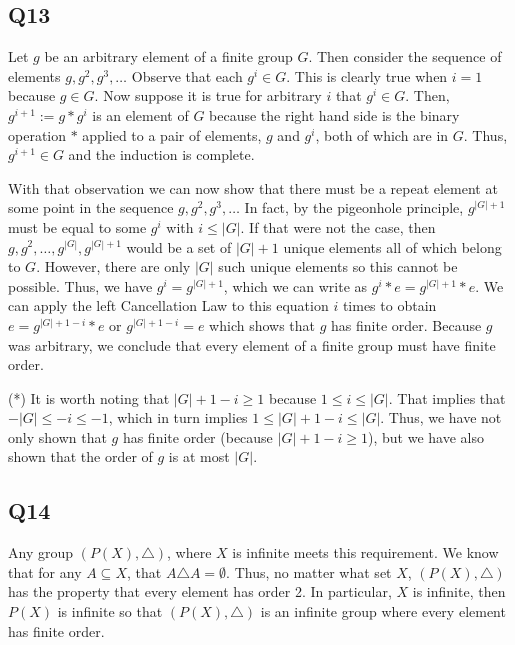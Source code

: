 \documentclass[12pt]{article}
\numberwithin{theorem}{section}
\numberwithin{equation}{section}
\numberwithin{remark}{section}
\numberwithin{definition}{section}
\numberwithin{theorem}{section}
\numberwithin{lemma}{section}
\numberwithin{example}{section}
\begin{document}
\subsection{Q13}

Let $g$ be an arbitrary element of a finite group $G$. Then consider the sequence of elements $g,g^2,g^3,\ldots$ Observe that each $g^i\in G$. This is clearly true when $i=1$ because $g\in G$. Now suppose it is true for arbitrary $i$ that $g^i \in G$. Then, $g^{i+1}:=g*g^i$ is an element of $G$ because the right hand side is the binary operation $*$ applied to a pair of elements, $g$ and $g^i$, both of which are in $G$. Thus, $g^{i+1}\in G$ and the induction is complete. 

With that observation we can now show that there must be a repeat element at some point in the sequence $g,g^2,g^3,\ldots$ In fact, by the pigeonhole principle, $g^{|G|+1}$ must be equal to some $g^i$ with $i\le |G|$. If that were not the case, then $g,g^2,\ldots, g^{|G|},g^{|G|+1}$ would be a set of $|G|+1$ unique elements all of which belong to $G$. However, there are only $|G|$ such unique elements so this cannot be possible. Thus, we have $g^i = g^{|G|+1}$, which we can write as $g^i * e= g^{|G|+1} * e$. We can apply the left Cancellation Law to this equation $i$ times to obtain $e = g^{|G|+1-i} * e$ or $g^{|G|+1-i} = e$ which shows that $g$ has finite order. Because $g$ was arbitrary, we conclude that every element of a finite group must have finite order. 

\vspace{\baselineskip}

\noindent (*) It is worth noting that $|G|+1-i\ge 1$ because $1\le i \le |G|$. That implies that $-|G| \le -i \le -1$, which in turn implies $1 \le |G|+1-i \le |G|$. Thus, we have not only shown that $g$ has finite order (because $|G|+1-i\ge 1$), but we have also shown that the order of $g$ is at most $|G|$.



\subsection{Q14}

Any group $(P(X),\triangle)$, where $X$ is infinite meets this requirement. We know that for any $A\subseteq X$, that $A\triangle A = \emptyset$. Thus, no matter what set $X$, $(P(X),\triangle)$ has the property that every element has order 2. In particular, $X$ is infinite, then $P(X)$ is infinite so that $(P(X),\triangle)$ is an infinite group where every element has finite order.
\end{document}
